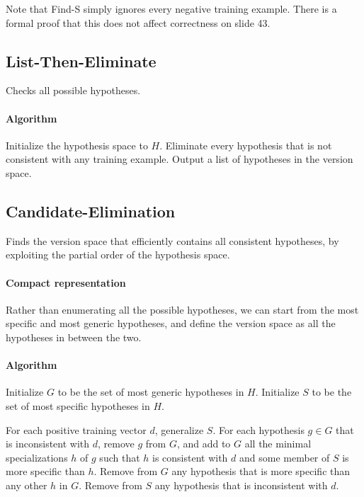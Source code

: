 \documentclass{idc_msc}
\begin{document}
Note that Find-S simply ignores every negative training example. There is a formal proof that this does not affect correctness on slide 43.

\subsection{List-Then-Eliminate}

Checks all possible hypotheses.

\paragraph{Algorithm}

Initialize the hypothesis space to $H$.
Eliminate every hypothesis that is not consistent with any training example.
Output a list of hypotheses in the version space.

\subsection{Candidate-Elimination}

Finds the version space that efficiently contains all consistent hypotheses, by exploiting the partial order of the hypothesis space.

\paragraph{Compact representation}

Rather than enumerating all the possible hypotheses, we can start from the most specific and most generic hypotheses, and define the version space as all the hypotheses in between the two.

\paragraph{Algorithm}

Initialize $G$ to be the set of most generic hypotheses in $H$.
Initialize $S$ to be the set of most specific hypotheses in $H$.

For each positive training vector $d$, generalize $S$.
For each hypothesis $g \in G$ that is inconsistent with $d$, remove $g$ from $G$, and add to $G$ all the minimal specializations $h$ of $g$ such that $h$ is consistent with $d$ and some member of $S$ is more specific than $h$.
Remove from $G$ any hypothesis that is more specific than any other $h$ in $G$.
Remove from $S$ any hypothesis that is inconsistent with $d$.
\end{document}
